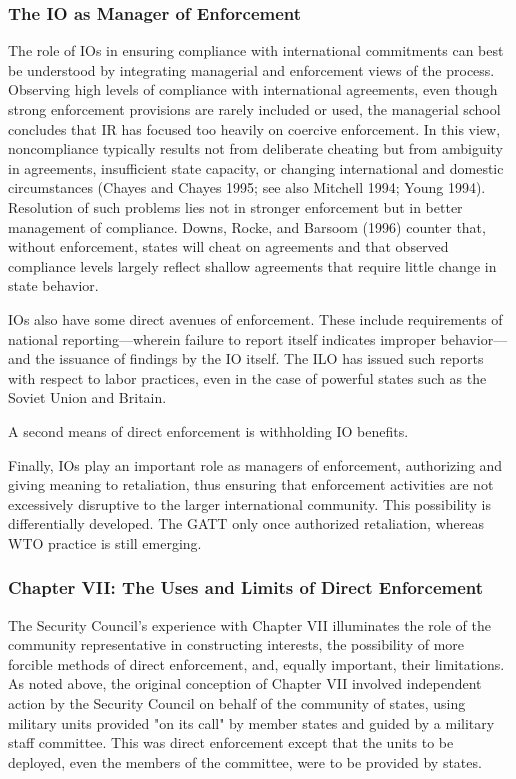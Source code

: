 \subsubsection{The IO as Manager of Enforcement}
The role of IOs in ensuring compliance with international commitments can best be understood by integrating managerial and enforcement views of the process. Observing high levels of compliance with international agreements, even though strong enforcement provisions are rarely included or used, the managerial school concludes that IR has focused too heavily on coercive enforcement. In this view, noncompliance typically results not from deliberate cheating but from ambiguity in agreements, insufficient state capacity, or changing international and domestic circumstances (Chayes and Chayes 1995; see also Mitchell 1994; Young 1994). Resolution of such problems lies not in stronger enforcement but in better management of compliance. Downs, Rocke, and Barsoom (1996) counter that, without enforcement, states will cheat on agreements and that observed compliance levels largely reflect shallow agreements that require little change in state behavior.

IOs also have some direct avenues of enforcement. These include requirements of national reporting—wherein failure to report itself indicates improper behavior—and the issuance of findings by the IO itself. The ILO has issued such reports with respect to labor practices, even in the case of powerful states such as the Soviet Union and Britain.

A second means of direct enforcement is withholding IO benefits.

Finally, IOs play an important role as managers of enforcement, authorizing and giving meaning to retaliation, thus ensuring that enforcement activities are not excessively disruptive to the larger international community. This possibility is differentially developed. The GATT only once authorized retaliation, whereas WTO practice is still emerging.

\subsubsection{Chapter VII: The Uses and Limits of Direct Enforcement}
The Security Council's experience with Chapter VII illuminates the role of the community representative in constructing interests, the possibility of more forcible methods of direct enforcement, and, equally important, their limitations. As noted above, the original conception of Chapter VII involved independent action by the Security Council on behalf of the community of states, using military units provided "on its call" by member states and guided by a military staff committee. This was direct enforcement except that the units to be deployed, even the members of the committee, were to be provided by states.

